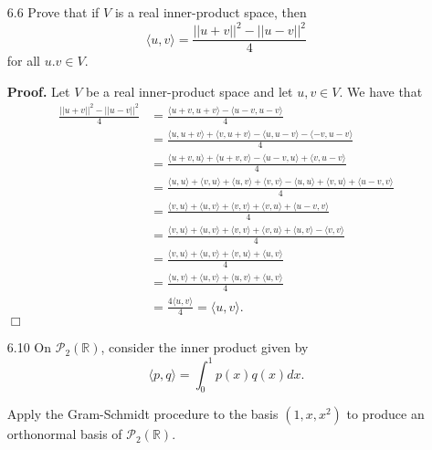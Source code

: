 \documentclass[9pt]{article}
\newcommand{\qed}{\hfill \ensuremath{\Box}}
\newcommand{\R}{\mathbb{R}}
\newcommand{\cyc}[1]{\langle #1 \rangle}
\begin{document}
\begin{enumerate}
   \item[6.6]  Prove that if $V$ is a real inner-product space, then
               $$\cyc{u, v} = \frac{||u + v||^2 - ||u - v||^2}{4}$$
               for all $u. v \in V$.

      \textbf{Proof.} Let $V$ be a real inner-product space and let
      $u, v \in V$. We have that
      \begin{align*}
         \frac{||u + v||^2 - ||u - v||^2}{4}
            &= \frac{\cyc{u + v, u + v} - \cyc{u - v, u - v}}{4} \\
            &= \frac{\cyc{u, u + v} + \cyc{v, u + v} -
                     \cyc{u, u - v} - \cyc{-v, u - v}}{4} \\
            &= \frac{\cyc{u + v, u} + \cyc{u + v, v} -
                     \cyc{u - v, u} + \cyc{v, u - v}}{4} \\
            &= \frac{\cyc{u, u} + \cyc{v, u} + \cyc{u, v} + \cyc{v, v} -
                     \cyc{u, u} + \cyc{v, u} + \cyc{u - v, v}}{4} \\
            &= \frac{\cyc{v, u} + \cyc{u, v} + \cyc{v, v} + 
                     \cyc{v, u} + \cyc{u - v, v}}{4} \\
            &= \frac{\cyc{v, u} + \cyc{u, v} + \cyc{v, v} + 
                     \cyc{v, u} + \cyc{u, v} - \cyc{v, v}}{4} \\
            &= \frac{\cyc{v, u} + \cyc{u, v} + \cyc{v, u} + \cyc{u, v}}{4} \\
            &= \frac{\cyc{u, v} + \cyc{u, v} + \cyc{u, v} + \cyc{u, v}}{4} \\
            &= \frac{4\cyc{u, v}}{4} = \cyc{u, v}.
      \end{align*} \qed
   \item[6.10] On $\mathcal{P}_2(\R)$, consider the inner product given by
               $$\cyc{p, q} = \int_0^1p(x)q(x) dx.$$

               Apply the Gram-Schmidt procedure to the basis $(1, x, x^2)$ to
               produce an orthonormal basis of $\mathcal{P}_2(\R)$.


\end{enumerate}
\end{document}
